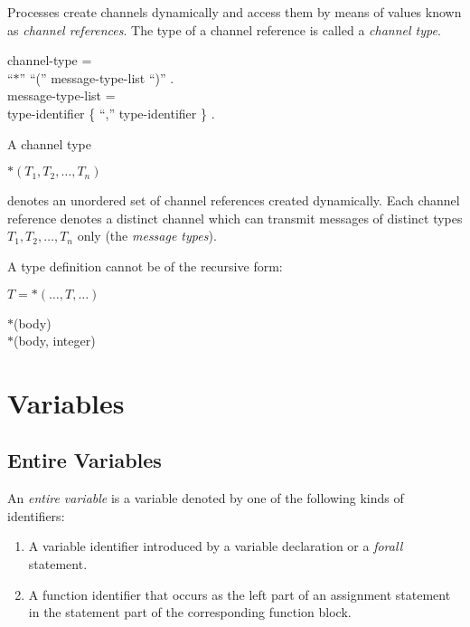 Processes create channels dynamically and access them by
means of values known as {\it channel references}. The type
of a channel reference is called a {\it channel type}.
\blankline
\begin{grammar}
  {\GA}channel-type =                                 \\
    {\GB}``$*$'' ``('' message-type-list ``)'' .      \\
  {\GA}message-type-list =                            \\
    {\GB}type-identifier \{ ``,'' type-identifier \} .\\
\end{grammar}

A channel type

\begin{center}
  $*(T_1,T_2,\ldots,T_n)$
\end{center}

\noindent
denotes an unordered set of channel references created
dynamically. Each channel reference denotes a distinct
channel which can transmit messages of distinct types
$T_1,T_2,\ldots,T_n$ only (the {\it message types}).

A type definition cannot be of the recursive form:

\begin{center}
  $T = *(\ldots,T,\ldots)$
\end{center}

\examples

\begin{program}{6.9em}
  {\PA}$*$(body)         \\
  {\PA}$*$(body, integer)
\end{program}


\section{Variables}

\subsection{Entire Variables}

An {\it entire variable} is a variable denoted by one of the
following kinds of identifiers:

\begin{enumerate}
  \item
  A variable identifier introduced by a variable declaration
  or a {\it forall} statement.
  \item
  A function identifier that occurs as the left part of an
  assignment statement in the statement part of the
  corresponding function block.
\end{enumerate}

